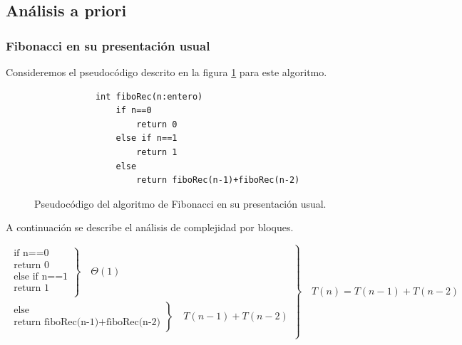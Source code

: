 \subsection*{Análisis a priori}
    \subsubsection{Fibonacci en su presentación usual}
    Consideremos el pseudocódigo descrito en la figura \ref{PseudocodigoFiboRec} para este algoritmo.
    \begin{figure}[h!]
        \centering
        \begin{verbatim}
            int fiboRec(n:entero)
                if n==0
                    return 0
                else if n==1
                    return 1
                else
                    return fiboRec(n-1)+fiboRec(n-2)
        \end{verbatim}  
        \caption{Pseudocódigo del algoritmo de Fibonacci en su presentación usual.}
        \label{PseudocodigoFiboRec}
    \end{figure}
    \newpage
    A continuación se describe el análisis de complejidad por bloques.
    
    \begin{equation*}
        \left.
            \begin{aligned}
                \left.
                    \begin{aligned}
                        \text{if n==0}\\
                        \text{return 0}\\
                        \text{else if n==1}\\
                        \text{return 1}\\
                    \end{aligned}
                \right\}
                \quad\Theta(1)
                \\
                \left.
                    \begin{aligned}
                        \text{else}\\
                        \text{return fiboRec(n-1)+fiboRec(n-2)}
                    \end{aligned}
                \right\}
                \quad T(n-1)+T(n-2)
                \\
            \end{aligned}
        \right\}
        \quad T(n)=T(n-1)+T(n-2)
    \end{equation*} 
    
